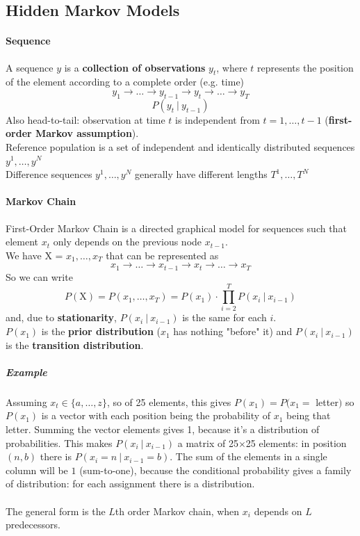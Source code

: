 \documentclass[10pt]{report}
\begin{document}
\subsection{Hidden Markov Models}
\paragraph{Sequence} A sequence $y$ is a \textbf{collection of observations} $y_t$, where $t$ represents the position of the element according to a complete order (e.g. time)
$$y_1\rightarrow \ldots\rightarrow y_{t-1}\rightarrow y_t\rightarrow\ldots\rightarrow y_T$$
$$P(y_t\:|\:y_{t-1})$$
Also head-to-tail: observation at time $t$ is independent from $t=1,\ldots,t-1$ (\textbf{first-order Markov assumption}).\\
Reference population is a set of independent and identically distributed sequences $y^1, \ldots, y^N$\\
Difference sequences $y^1, \ldots, y^N$ generally have different lengths $T^1,\ldots,T^N$
\paragraph{Markov Chain} First-Order Markov Chain is a directed graphical model for sequences such that element $x_t$ only depends on the previous node $x_{t-1}$.\\
We have X = $x_1,\ldots,x_T$ that can be represented as 
$$x_1\rightarrow \ldots\rightarrow x_{t-1}\rightarrow x_t\rightarrow\ldots\rightarrow x_T$$
So we can write $$P(\text{X}) = P(x_1,\ldots,x_T) = P(x_1)\cdot\prod_{i=2}^T P(x_i\:|\:x_{i-1})$$
and, due to \textbf{stationarity}, $P(x_i\:|\:x_{i-1})$ is the same for each $i$.\\
$P(x_1)$ is the \textbf{prior distribution} ($x_1$ has nothing "before" it) and $P(x_i\:|\:x_{i-1})$ is the \textbf{transition distribution}.
\subparagraph{Example} Assuming $x_t\in\{a,\ldots,z\}$, so of 25 elements, this gives $P(x_1) = P(x_1 =$ letter$)$ so $P(x_1)$ is a vector with each position being the probability of $x_1$ being that letter. Summing the vector elements gives 1, because it's a distribution of probabilities. This makes $P(x_i\:|\:x_{i-1})$ a matrix of 25$\times$25 elements: in position $(n,b)$ there is $P(x_i=n\:|\:x_{i-1}=b)$. The sum of the elements in a single column will be $1$ (sum-to-one), because the conditional probability gives a family of distribution: for each assignment there is a distribution.\\\\
The general form is the $L$th order Markov chain, when $x_i$ depends on $L$ predecessors.
\end{document}

